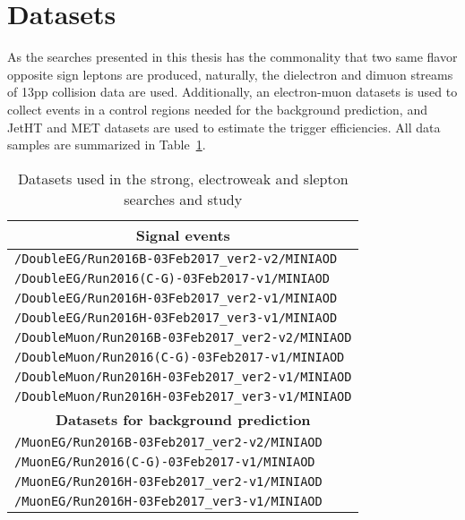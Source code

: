 \section{Datasets}\label{sec:datasets}
\noindent\justify
As the searches presented in this thesis has the commonality that two same flavor opposite sign leptons are produced, naturally, the dielectron and dimuon streams of 13\TeV pp collision data are used.
Additionally, an electron-muon datasets is used to collect events in a control regions needed for the background prediction, and JetHT and MET datasets are used to estimate the trigger efficiencies.
All data samples are summarized in Table~\ref{tab:datasets}.  
\begin{table}[ht!]
\def\arraystretch{1.2}
    \caption{Datasets used in the strong, electroweak and slepton searches and \ptmiss study}
    \label{tab:datasets}
    \begin{center}
        \begin{tabular}{ l}
        \hline\hline 
        \multicolumn{1}{c}{\textbf{Signal events}} \\
        \hline
        \texttt{/DoubleEG/Run2016B-03Feb2017\_ver2-v2/MINIAOD}    \\
        \texttt{/DoubleEG/Run2016(C-G)-03Feb2017-v1/MINIAOD}     \\
        \texttt{/DoubleEG/Run2016H-03Feb2017\_ver2-v1/MINIAOD}    \\
        \texttt{/DoubleEG/Run2016H-03Feb2017\_ver3-v1/MINIAOD}    \\
        \texttt{/DoubleMuon/Run2016B-03Feb2017\_ver2-v2/MINIAOD}   \\
        \texttt{/DoubleMuon/Run2016(C-G)-03Feb2017-v1/MINIAOD}  \\
        \texttt{/DoubleMuon/Run2016H-03Feb2017\_ver2-v1/MINIAOD}    \\
        \texttt{/DoubleMuon/Run2016H-03Feb2017\_ver3-v1/MINIAOD}   \\
        \hline        
        \multicolumn{1}{c}{\textbf{Datasets for background prediction}} \\
        \hline
        \texttt{/MuonEG/Run2016B-03Feb2017\_ver2-v2/MINIAOD}    \\
        \texttt{/MuonEG/Run2016(C-G)-03Feb2017-v1/MINIAOD}    \\
        \texttt{/MuonEG/Run2016H-03Feb2017\_ver2-v1/MINIAOD}    \\
        \texttt{/MuonEG/Run2016H-03Feb2017\_ver3-v1/MINIAOD}    \\           

\end{tabular}
\end{center}
\end{table}
